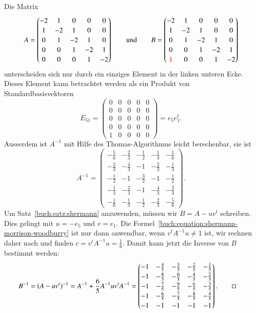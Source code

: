 \begin{beispiel}
Die Matrix
\[
A
=
\begin{pmatrix}
-2& 1& 0& 0& 0\\
 1&-2& 1& 0& 0\\
 0& 1&-2& 1& 0\\
 0& 0& 1&-2& 1\\
 0& 0& 0& 1&-2
\end{pmatrix}
\qquad
\text{und}
\qquad
B
=
\begin{pmatrix}
-2& 1& 0& 0& 0\\
 1&-2& 1& 0& 0\\
 0& 1&-2& 1& 0\\
 0& 0& 1&-2& 1\\
{\color{red} 1}& 0& 0& 1&-2
\end{pmatrix}
\]
unterscheiden sich nur durch ein einziges Element in der linken unteren
Ecke.
Dieses Element kann betrachtet werden als ein Produkt von
Standardbasisvektoren
\[
E_{51}
=
\begin{pmatrix}
 0& 0& 0& 0& 0\\
 0& 0& 0& 0& 0\\
 0& 0& 0& 0& 0\\
 0& 0& 0& 0& 0\\
 1& 0& 0& 0& 0
\end{pmatrix}
=
e_5e_1^t.
\]
Ausserdem ist $A^{-1}$ mit Hilfe des Thomas-Algorithmus leicht berechenbar,
sie ist
\[
\renewcommand\arraystretch{1.15}
A^{-1}
= 
\begin{pmatrix}
-\frac56 & -\frac23 & -\frac12 & -\frac13 & -\frac16 \\
-\frac23 & -\frac43 & -1       & -\frac23 & -\frac13 \\
-\frac12 & -1       & -\frac32 & -1       & -\frac12 \\
-\frac13 & -\frac23 & -1       & -\frac43 & -\frac23 \\
-\frac16 & -\frac13 & -\frac12 & -\frac23 & -\frac56
\end{pmatrix}.
\]
Um Satz~\ref{buch:satz:shermann} anzuwenden, müssen wir $B=A-uv^t$ schreiben.
Dies gelingt mit $u=-e_5$ und $v=e_1$.
Die Formel~\eqref{buch:equation:shermann-morrison-woodburry} ist nur dann
anwendbar, wenn $v^tA^{-1}u\ne 1$ ist, wir rechnen daher nach und finden
$c=v^tA^{-1}u=\frac16$.
Damit kann jetzt die Inverse von $B$ bestimmt werden:
\begin{align*}
B^{-1}
&=
(A-uv^t)^{-1}
=
A^{-1} + \frac65 A^{-1}uv^tA^{-1}
=
\renewcommand\arraystretch{1.15}
\begin{pmatrix}
-1& -\frac45 & -\frac35 & -\frac25 & -\frac15 \\
-1& -\frac85 & -\frac65 & -\frac45 & -\frac25 \\
-1& -\frac75 & -\frac95 & -\frac65 & -\frac35 \\
-1& -\frac65 & -\frac75 & -\frac85 & -\frac45 \\
-1& -1       & -1       & -1       & -1       
\end{pmatrix}.
\qedhere
\end{align*}
\end{beispiel}


